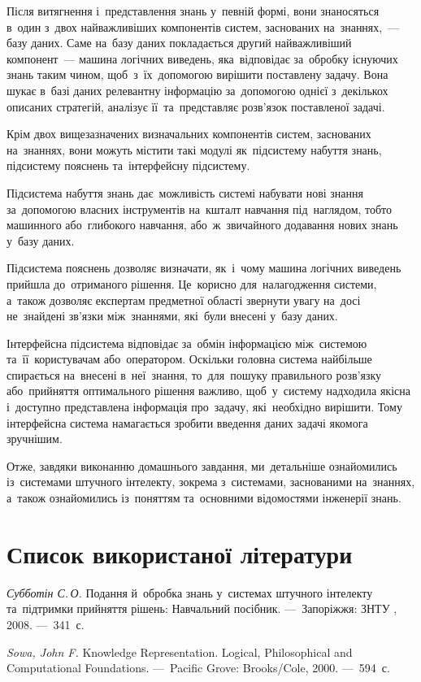 \documentclass[
  a4paper,
  oneside,
  BCOR = 10mm,
  DIV = 12,
  12pt,
  headings = normal,
]{scrartcl}
\newcommand{\allcaps}[1]{%
  {%
    \addfontfeatures{%
      Letters = UppercaseSmallCaps,
      LetterSpace = 8,%
    }%
    #1%
  }%
}
\begin{document}
    Після витягнення і~представлення знань у~певній формі, вони знаносяться в~один з~двох найважливіших компонентів систем, заснованих на~знаннях,~— базу даних. Саме на~базу даних покладається другий найважливіший компонент~— машина логічних виведень, яка~відповідає за~обробку існуючих знань таким чином, щоб~з~їх~допомогою вирішити поставлену задачу. Вона шукає в~базі даних релевантну інформацію за~допомогою однієї з~декількох описаних стратегій, аналізує її~та~представляє розв'язок поставленої задачі.

    Крім двох вищезазначених визначальних компонентів систем, заснованих на~знаннях, вони можуть містити такі модулі як~підсистему набуття знань, підсистему пояснень та~інтерфейсну підсистему.

    Підсистема набуття знань дає~можливість системі набувати нові знання за~допомогою власних інструментів на~кшталт навчання під~наглядом, тобто машинного або~глибокого навчання, або~ж~звичайного додавання нових знань у~базу даних.

    Підсистема пояснень дозволяє визначати, як~і~чому машина логічних виведень прийшла до~отриманого рішення. Це~корисно для~налагодження системи, а~також дозволяє експертам предметної області звернути увагу на~досі не~знайдені зв'язки між~знаннями, які~були внесені у~базу даних.

    Інтерфейсна підсистема відповідає за~обмін інформацією між~системою та~її~користувачам або~оператором. Оскільки головна система найбільше спирається на~внесені в~неї~знання, то~для~пошуку правильного розв'язку або~прийняття оптимального рішення важливо, щоб~у~систему надходила якісна і~доступно представлена інформація про~задачу, які~необхідно вирішити. Тому інтерфейсна система намагається зробити введення даних задачі якомога зручнішим.

    Отже, завдяки виконанню домашнього завдання, ми~детальніше ознайомились із~системами штучного інтелекту, зокрема з~системами, заснованими на~знаннях, а~також ознайомились із~поняттям та~основними відомостями інженерії знань.

  \clearpage
  \section{Список використаної літератури}
  \begin{litlist}
    \item \textit{Субботін С.\,О.} Подання й~обробка знань у~системах штучного інтелекту та~підтримки прийняття рішень: Навчальний посібник. —~Запоріжжя: \allcaps{ЗНТУ}, 2008. —~341~с.
    \item \textenglish{\textit{Sowa, John F.} Knowledge Representation. Logical, Philosophical and Computational Foundations. —~Pacific Grove: Brooks/Cole, 2000}. —~594~с.
  \end{litlist}
\end{document}
